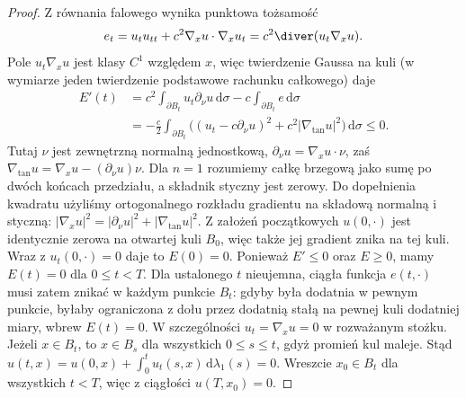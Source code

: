 \begin{proof}
Z równania falowego wynika punktowa tożsamość
\[
 e_t=u_tu_{tt}+c^2\nabla_xu\cdot\nabla_xu_t
     =c^2\diver(u_t\nabla_xu).
\]
Pole $u_t\nabla_xu$ jest klasy $C^1$ względem $x$,
więc twierdzenie Gaussa na kuli (w wymiarze jeden
twierdzenie podstawowe rachunku całkowego) daje
\[
\begin{aligned}
 E'(t)&=c^2\int_{\partial B_t}u_t\partial_\nu u
 \,\mathrm d\sigma-c\int_{\partial B_t}e\,\mathrm d\sigma\\
 &=-\frac c2\int_{\partial B_t}
 \bigl((u_t-c\partial_\nu u)^2+c^2|\nabla_{\tan}u|^2\bigr)
 \,\mathrm d\sigma\leq0.
\end{aligned}
\]
Tutaj $\nu$ jest zewnętrzną normalną jednostkową,
$\partial_\nu u=\nabla_xu\cdot\nu$, zaś
$\nabla_{\tan}u=\nabla_xu-(\partial_\nu u)\nu$.
Dla $n=1$ rozumiemy całkę brzegową jako sumę po
dwóch końcach przedziału, a składnik styczny jest
zerowy. Do dopełnienia kwadratu użyliśmy
ortogonalnego rozkładu gradientu na składową
normalną i styczną:
$|\nabla_xu|^2=|\partial_\nu u|^2+|\nabla_{\tan}u|^2$.
Z założeń początkowych $u(0,\cdot)$ jest
identycznie zerowa na otwartej kuli $B_0$,
więc także jej gradient znika na tej kuli.
Wraz z $u_t(0,\cdot)=0$ daje to $E(0)=0$.
Ponieważ $E'\leq0$ oraz $E\geq0$,
mamy $E(t)=0$ dla $0\leq t<T$.
Dla ustalonego $t$ nieujemna, ciągła funkcja
$e(t,\cdot)$ musi zatem znikać w każdym punkcie
$B_t$: gdyby była dodatnia w pewnym punkcie,
byłaby ograniczona z dołu przez dodatnią stałą
na pewnej kuli dodatniej miary, wbrew $E(t)=0$.
W szczególności $u_t=\nabla_xu=0$ w rozważanym
stożku. Jeżeli $x\in B_t$, to $x\in B_s$ dla
wszystkich $0\leq s\leq t$, gdyż promień kul
maleje. Stąd
$u(t,x)=u(0,x)+\int_0^t u_t(s,x)\,
\mathrm d\lambda_1(s)=0$.
Wreszcie $x_0\in B_t$ dla wszystkich $t<T$,
więc z ciągłości $u(T,x_0)=0$.
\end{proof}


